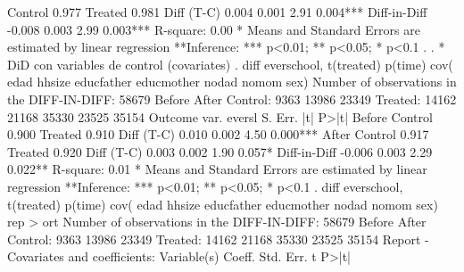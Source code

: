    Control      {\VBAR} 0.977   {\VBAR}         {\VBAR}         {\VBAR} 
   Treated      {\VBAR} 0.981   {\VBAR}         {\VBAR}         {\VBAR} 
   Diff (T-C)   {\VBAR} 0.004   {\VBAR} 0.001   {\VBAR} 2.91    {\VBAR} 0.004***
                {\VBAR}         {\VBAR}         {\VBAR}         {\VBAR} 
Diff-in-Diff    {\VBAR} -0.008  {\VBAR} 0.003   {\VBAR} 2.99    {\VBAR} 0.003***
R-square:    0.00
* Means and Standard Errors are estimated by linear regression
**Inference: *** p<0.01; ** p<0.05; * p<0.1
{\smallskip}
. 
. * DiD con variables de control (covariates)
. diff everschool, t(treated) p(time) cov( edad hhsize educfather educmother nodad nomom  sex)
{}
{\smallskip}
{}
Number of observations in the DIFF-IN-DIFF: 58679
            Before         After    
   Control: 9363           13986       23349
   Treated: 14162          21168       35330
            23525          35154
 Outcome var.   {\VBAR} evers{\tytilde}l {\VBAR} S. Err. {\VBAR}   |t|   {\VBAR}  P>|t|
Before          {\VBAR}         {\VBAR}         {\VBAR}         {\VBAR} 
   Control      {\VBAR} 0.900   {\VBAR}         {\VBAR}         {\VBAR} 
   Treated      {\VBAR} 0.910   {\VBAR}         {\VBAR}         {\VBAR} 
   Diff (T-C)   {\VBAR} 0.010   {\VBAR} 0.002   {\VBAR} 4.50    {\VBAR} 0.000***
After           {\VBAR}         {\VBAR}         {\VBAR}         {\VBAR} 
   Control      {\VBAR} 0.917   {\VBAR}         {\VBAR}         {\VBAR} 
   Treated      {\VBAR} 0.920   {\VBAR}         {\VBAR}         {\VBAR} 
   Diff (T-C)   {\VBAR} 0.003   {\VBAR} 0.002   {\VBAR} 1.90    {\VBAR} 0.057*
                {\VBAR}         {\VBAR}         {\VBAR}         {\VBAR} 
Diff-in-Diff    {\VBAR} -0.006  {\VBAR} 0.003   {\VBAR} 2.29    {\VBAR} 0.022**
R-square:    0.01
* Means and Standard Errors are estimated by linear regression
**Inference: *** p<0.01; ** p<0.05; * p<0.1
{\smallskip}
. diff everschool, t(treated) p(time) cov( edad hhsize educfather educmother nodad nomom  sex) rep
> ort
{}
{\smallskip}
{}
Number of observations in the DIFF-IN-DIFF: 58679
            Before         After    
   Control: 9363           13986       23349
   Treated: 14162          21168       35330
            23525          35154
Report - Covariates and coefficients:
 Variable(s)         {\VBAR}   Coeff.   {\VBAR} Std. Err. {\VBAR}    t    {\VBAR}  P>|t|
